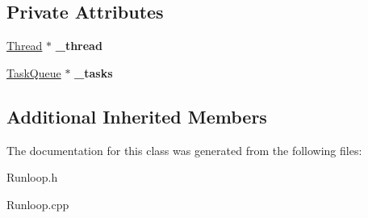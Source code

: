\subsection*{Private Attributes}
\begin{DoxyCompactItemize}
\item 
\mbox{\label{class_runloop_thread_aa41cce8dc90002f64989d52b5dfd0a10}} 
\hyperlink{class_thread}{Thread} $\ast$ {\bfseries \+\_\+thread}
\item 
\mbox{\label{class_runloop_thread_a42a37e8d9938db7c09fd1ff0fe91171c}} 
\hyperlink{class_task_queue}{Task\+Queue} $\ast$ {\bfseries \+\_\+tasks}
\end{DoxyCompactItemize}
\subsection*{Additional Inherited Members}


The documentation for this class was generated from the following files\+:\begin{DoxyCompactItemize}
\item 
Runloop.\+h\item 
Runloop.\+cpp\end{DoxyCompactItemize}
